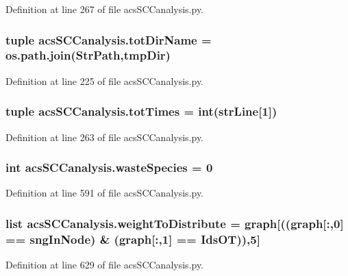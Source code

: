 Definition at line 267 of file acs\+S\+C\+Canalysis.\+py.

\hypertarget{a00130_a5903034df3d32525785e697152efbeb3}{
\subsubsection[{tot\+Dir\+Name}]{\setlength{\rightskip}{0pt plus 5cm}tuple acs\+S\+C\+Canalysis.\+tot\+Dir\+Name = os.\+path.\+join({\bf Str\+Path},tmp\+Dir)}}\label{a00130_a5903034df3d32525785e697152efbeb3}


Definition at line 225 of file acs\+S\+C\+Canalysis.\+py.

\hypertarget{a00130_a20df40e09bc9514382d71f15783c7856}{
\subsubsection[{tot\+Times}]{\setlength{\rightskip}{0pt plus 5cm}tuple acs\+S\+C\+Canalysis.\+tot\+Times = int({\bf str\+Line}\mbox{[}1\mbox{]})}}\label{a00130_a20df40e09bc9514382d71f15783c7856}


Definition at line 263 of file acs\+S\+C\+Canalysis.\+py.

\hypertarget{a00130_ace0de61f3c6aa14b4197156be3a68280}{
\subsubsection[{waste\+Species}]{\setlength{\rightskip}{0pt plus 5cm}int acs\+S\+C\+Canalysis.\+waste\+Species = 0}}\label{a00130_ace0de61f3c6aa14b4197156be3a68280}


Definition at line 591 of file acs\+S\+C\+Canalysis.\+py.

\hypertarget{a00130_a5162bfbe5eb2618736d1f77bb3125a9b}{
\subsubsection[{weight\+To\+Distribute}]{\setlength{\rightskip}{0pt plus 5cm}list acs\+S\+C\+Canalysis.\+weight\+To\+Distribute = {\bf graph}\mbox{[}(({\bf graph}\mbox{[}\+:,0\mbox{]} == sng\+In\+Node) \& ({\bf graph}\mbox{[}\+:,1\mbox{]} == Ids\+O\+T)),5\mbox{]}}}\label{a00130_a5162bfbe5eb2618736d1f77bb3125a9b}


Definition at line 629 of file acs\+S\+C\+Canalysis.\+py.

